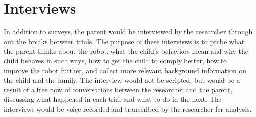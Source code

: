 \section{Interviews}
In addition to surveys, the parent would be interviewed by the researcher through out the breaks between trials.  The purpose of these interviews is to probe what the parent thinks about the robot, what the child's behaviors mean and why the child behaves in such ways, how to get the child to comply better, how to improve the robot further, and collect more relevant background information on the child and the family.  The interview would not be scripted, but would be a result of a free flow of conversations between the researcher and the parent, discussing what happened in each trial and what to do in the next.  The interviews would be voice recorded and transcribed by the researcher for analysis.

